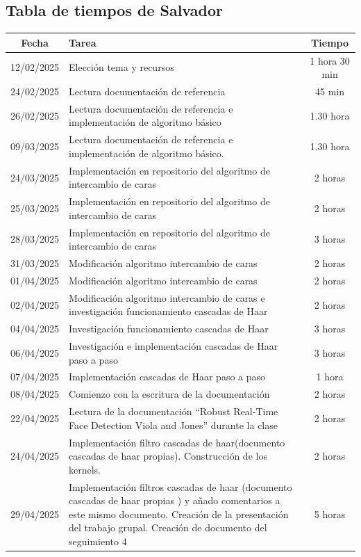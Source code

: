 \documentclass[a4paper]{article}
\begin{document}
\subsection{Tabla de tiempos de Salvador}


\begin{table}[H]
\centering
\begin{tabular}{|c|p{10cm}|c|}
\hline
\textbf{Fecha} & \textbf{Tarea} & \textbf{Tiempo} \\
\hline
12/02/2025 & Elección tema y recursos & 1 hora 30 min \\
24/02/2025 & Lectura documentación de referencia & 45 min \\
26/02/2025 & Lectura documentación de referencia e implementación de algoritmo básico & 1.30 hora \\
09/03/2025 & Lectura documentación de referencia e implementación de algoritmo básico. & 1.30 hora \\
24/03/2025 & Implementación en repositorio del algoritmo de intercambio de caras & 2 horas \\
25/03/2025 & Implementación en repositorio del algoritmo de intercambio de caras & 2 horas \\
28/03/2025 & Implementación en repositorio del algoritmo de intercambio de caras & 3 horas \\
31/03/2025 & Modificación algoritmo intercambio de caras & 2 horas \\
01/04/2025 & Modificación algoritmo intercambio de caras & 2 horas \\
02/04/2025 & Modificación algoritmo intercambio de caras e investigación funcionamiento cascadas de Haar & 2 horas \\
04/04/2025 & Investigación funcionamiento cascadas de Haar & 3 horas \\
06/04/2025 & Investigación e implementación cascadas de Haar paso a paso & 3 horas \\
07/04/2025 & Implementación cascadas de Haar paso a paso & 1 hora \\
08/04/2025 & Comienzo con la escritura de la documentación & 2 horas \\
22/04/2025 & Lectura de la documentación “Robust Real-Time Face Detection Viola and Jones” durante la clase & 2 horas \\
24/04/2025 & Implementación filtro cascadas de haar(documento cascadas de haar propias). Construcción de los kernels. & 2 horas \\
29/04/2025 & Implementación filtros cascadas de haar (documento cascadas de haar propias )  y añado comentarios a este mismo documento. Creación de la presentación del trabajo grupal. Creación de documento del seguimiento 4 & 5 horas \\

\end{tabular}
\end{table}
\end{document}
